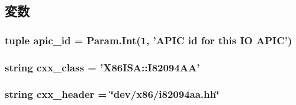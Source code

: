 \subsection{変数}
\hypertarget{classI82094AA_1_1I82094AA_a30a6ed207c29d3ce4a8cf2fe480703c0}{
\subsubsection[{apic\_\-id}]{\setlength{\rightskip}{0pt plus 5cm}tuple {\bf apic\_\-id} = Param.Int(1, 'APIC id for this IO APIC')}}
\label{classI82094AA_1_1I82094AA_a30a6ed207c29d3ce4a8cf2fe480703c0}
\hypertarget{classI82094AA_1_1I82094AA_a58cd55cd4023648e138237cfc0822ae3}{
\subsubsection[{cxx\_\-class}]{\setlength{\rightskip}{0pt plus 5cm}string {\bf cxx\_\-class} = '{\bf X86ISA::I82094AA}'}}
\label{classI82094AA_1_1I82094AA_a58cd55cd4023648e138237cfc0822ae3}
\hypertarget{classI82094AA_1_1I82094AA_a17da7064bc5c518791f0c891eff05fda}{
\subsubsection[{cxx\_\-header}]{\setlength{\rightskip}{0pt plus 5cm}string {\bf cxx\_\-header} = \char`\"{}dev/x86/i82094aa.hh\char`\"{}}}
\label{classI82094AA_1_1I82094AA_a17da7064bc5c518791f0c891eff05fda}



